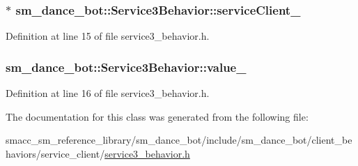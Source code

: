 \subsubsection[{\texorpdfstring{service\+Client\+\_\+}{serviceClient_}}]{$\ast$ sm\+\_\+dance\+\_\+bot\+::\+Service3\+Behavior\+::service\+Client\+\_\+\hspace{0.3cm}{\ttfamily [private]}}\hypertarget{classsm__dance__bot_1_1Service3Behavior_afe77243f8c5938cf9c754897d41cceff}{}\label{classsm__dance__bot_1_1Service3Behavior_afe77243f8c5938cf9c754897d41cceff}


Definition at line 15 of file service3\+\_\+behavior.\+h.

\subsubsection[{\texorpdfstring{value\+\_\+}{value_}}]{ sm\+\_\+dance\+\_\+bot\+::\+Service3\+Behavior\+::value\+\_\+\hspace{0.3cm}{\ttfamily [private]}}\hypertarget{classsm__dance__bot_1_1Service3Behavior_a85d2c6056f1cc77bcfc0139c4ce71ba9}{}\label{classsm__dance__bot_1_1Service3Behavior_a85d2c6056f1cc77bcfc0139c4ce71ba9}


Definition at line 16 of file service3\+\_\+behavior.\+h.



The documentation for this class was generated from the following file\+:\begin{DoxyCompactItemize}
\item 
smacc\+\_\+sm\+\_\+reference\+\_\+library/sm\+\_\+dance\+\_\+bot/include/sm\+\_\+dance\+\_\+bot/client\+\_\+behaviors/service\+\_\+client/\hyperlink{service3__behavior_8h}{service3\+\_\+behavior.\+h}\end{DoxyCompactItemize}
